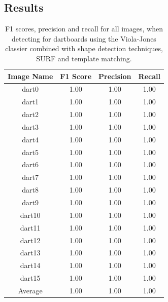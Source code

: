 \documentclass[conference]{IEEEtran}
\begin{document}
\subsection{Results}
\begin{table}[htp]
\caption{F1 scores, precision and recall for all images, when detecting for dartboards using the Viola-Jones classier combined with shape detection techniques, SURF and template matching. }
\begin{center}
\begin{tabular}{||c|c|c|c||}
\hline
Image Name		 	& F1 Score 	& Precision	& Recall            \\ \hline
dart0					& 1.00		&	1.00		& 1.00		\\
dart1					& 1.00		&	1.00		& 1.00		\\
dart2					& 1.00		&	1.00		& 1.00		\\
dart3					& 1.00		&	1.00		& 1.00		\\
dart4					& 1.00		&	1.00		& 1.00		\\
dart5					& 1.00		&	1.00		& 1.00		\\
dart6					& 1.00		&	1.00		& 1.00		\\
dart7					& 1.00		&	1.00		& 1.00		\\
dart8					& 1.00		&	1.00		& 1.00		\\
dart9					& 1.00		&	1.00		& 1.00		\\
dart10				& 1.00		&	1.00		& 1.00		\\
dart11				& 1.00		&	1.00		& 1.00		\\
dart12				& 1.00		&	1.00		& 1.00		\\
dart13				& 1.00		&	1.00		& 1.00		\\
dart14				& 1.00		&	1.00		& 1.00		\\
dart15				& 1.00		&	1.00		& 1.00		\\ \hline
Average 		 		& 1.00		&	1.00		& 1.00 		\\ \hline
\end{tabular}
\end{center}
\label{default}
\end{table}
\end{document}

